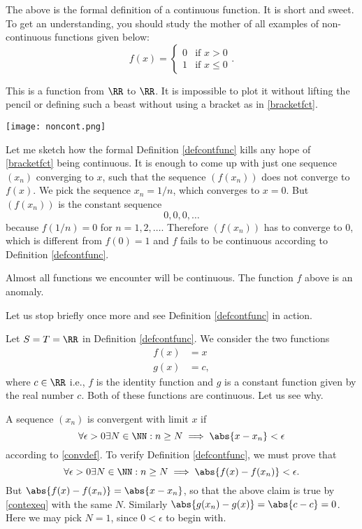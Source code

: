 \documentclass{article}
\begin{document}
The above is the formal definition of a continuous function. It is short and sweet. To
get an understanding, you should study the mother of all examples of 
non-continuous functions given below:
\begin{equation}\label{bracketfct}
f(x) =
\begin{cases}
  0 &\text{if } x > 0\\
  1 &\text{if } x \leq 0
\end{cases}.
\end{equation}

This is a function from $\RR$ to $\RR$. It is impossible to plot it
without lifting the pencil or defining such a beast without using a
bracket as in \eqref{bracketfct}.

\texttt{[image: noncont.png]}

Let me sketch how the formal Definition \ref{defcontfunc} kills any hope of
\eqref{bracketfct} being continuous. It is enough to come up with just
one sequence $(x_n)$ converging to $x$, such that the sequence
$(f(x_n))$ does not converge to $f(x)$.  We pick
the sequence $x_n= 1/n$, which converges to $x = 0$.
But $(f(x_n))$
is the constant sequence
$$
0, 0, 0, \dots
$$
because $f(1/n) = 0$ for $n = 1, 2, \dots$. Therefore $(f(x_n))$ has to converge
to $0$, which is different from $f(0) = 1$ and $f$ fails to be continuous according
to Definition \ref{defcontfunc}.

Almost all functions we encounter will be continuous. The function $f$ above is an
anomaly.

Let us stop briefly once more and see Definition \ref{defcontfunc} in action.

\begin{example}\label{contbasic}
  Let $S = T = \RR$ in Definition \ref{defcontfunc}. We consider the two functions
  \begin{align*}
    f(x) &= x\\
    g(x) &= c,
  \end{align*}
  where $c\in \RR$ i.e., $f$ is the identity function and $g$ is a
  constant function given by the real number $c$. Both of these
  functions are continuous. Let us see why.

  A sequence $(x_n)$ is convergent with limit $x$ if
  \begin{equation}\label{contexeq}
  \forall \epsilon > 0 \exists N\in \NN: n\geq N \implies \abs{x - x_n}<\epsilon
  \end{equation}
  according to \eqref{convdef}. To verify Definition \ref{defcontfunc}, we must prove that 
  $$
  \forall \epsilon > 0 \exists N\in \NN: n\geq N \implies \abs{f(x) - f(x_n)}<\epsilon.
  $$
  But $\abs{f(x) - f(x_n)} = \abs{x - x_n}$, so that the above claim is true
  by \eqref{contexeq} with the same $N$.
  Similarly $\abs{g(x_n) - g(x)} = \abs{c - c} = 0$. Here we may pick $N=1$, since
  $0 < \epsilon$ to begin with.
\end{example}
\end{document}
